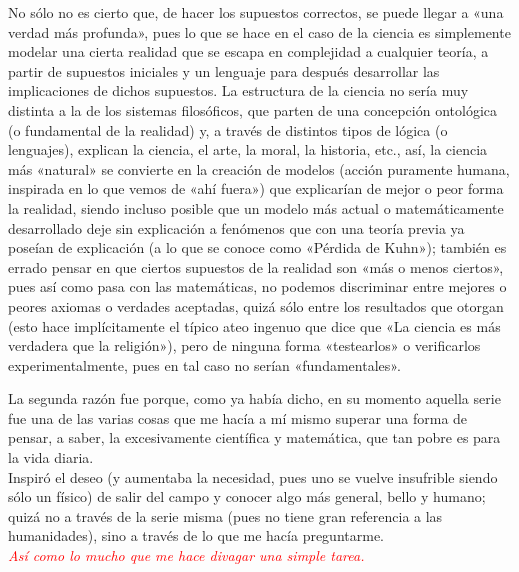 \documentclass{article}
\begin{document}
No sólo no es cierto que, de hacer los supuestos correctos, se puede llegar a «una verdad más profunda», pues lo que se hace en el caso de la ciencia es simplemente modelar una cierta realidad que se escapa en complejidad a cualquier teoría, a partir de supuestos iniciales y un lenguaje para después desarrollar las implicaciones de dichos supuestos. La estructura de la ciencia no sería muy distinta a la de los sistemas filosóficos, que parten de una concepción ontológica (o fundamental de la realidad) y, a través de distintos tipos de lógica (o lenguajes), explican la ciencia, el arte, la moral, la historia, etc., así, la ciencia más «natural» se convierte en la creación de modelos (acción puramente humana, inspirada en lo que vemos de «ahí fuera») que explicarían de mejor o peor forma la realidad, siendo incluso posible que un modelo más actual o matemáticamente desarrollado deje sin explicación a fenómenos que con una teoría previa ya poseían de explicación (a lo que se conoce como «Pérdida de Kuhn»); también es errado pensar en que ciertos supuestos de la realidad son «más o menos ciertos», pues así como pasa con las matemáticas, no podemos discriminar entre mejores o peores axiomas o verdades aceptadas, quizá sólo entre los resultados que otorgan (esto hace implícitamente el típico ateo ingenuo que dice que «La ciencia es más verdadera que la religión»), pero de ninguna forma «testearlos» o verificarlos experimentalmente, pues en tal caso no serían «fundamentales».

\textcolor{Apricot}{La segunda razón fue porque, como ya había dicho, en su momento aquella serie fue una de las varias cosas que me hacía a mí mismo superar una forma de pensar, a saber, la excesivamente científica y matemática, que tan pobre es para la vida diaria. \\
Inspiró el deseo (y aumentaba la necesidad, pues uno se vuelve insufrible siendo sólo un físico) de salir del campo y conocer algo más general, bello y humano; quizá no a través de la serie misma (pues no tiene gran referencia a las humanidades), sino a través de lo que me hacía preguntarme.} \\
\textcolor{Red}{\emph{Así como lo mucho que me hace divagar una simple tarea.}} \\
\end{document}
